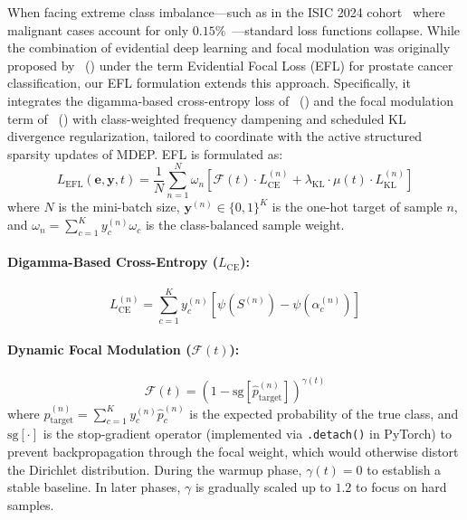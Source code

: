 \documentclass[letterpaper]{article} %
\begin{document}
When facing extreme class imbalance---such as in the ISIC 2024 cohort~\cite{isic2024} where malignant cases account for only $0.15\%$~\cite{johnson2019survey}---standard loss functions collapse. While the combination of evidential deep learning and focal modulation was originally proposed by \citeauthor{zhou2023domain}~(\citeyear{zhou2023domain}) under the term Evidential Focal Loss (EFL) for prostate cancer classification, our EFL formulation extends this approach. Specifically, it integrates the digamma-based cross-entropy loss of \citeauthor{sensoy2018evidential}~(\citeyear{sensoy2018evidential}) and the focal modulation term of \citeauthor{lin2017focal}~(\citeyear{lin2017focal}) with class-weighted frequency dampening and scheduled KL divergence regularization, tailored to coordinate with the active structured sparsity updates of MDEP. EFL is formulated as:
\begin{equation}\label{eq:efl}
    L_{\text{EFL}}(\bm{e}, \bm{y}, t) = \frac{1}{N} \sum_{n=1}^N \omega_n \left[\mathcal{F}(t) \cdot L_{\text{CE}}^{(n)} + \lambda_{\text{KL}} \cdot \mu(t) \cdot L_{\text{KL}}^{(n)}\right]
\end{equation}
where $N$ is the mini-batch size, $\bm{y}^{(n)} \in \{0, 1\}^K$ is the one-hot target of sample $n$, and $\omega_n = \sum_{c=1}^K y_c^{(n)} \omega_c$ is the class-balanced sample weight.

\paragraph{Digamma-Based Cross-Entropy ($L_{\text{CE}}$):}
\begin{equation}
    L_{\text{CE}}^{(n)} = \sum_{c=1}^K y_c^{(n)} \left[\psi(S^{(n)}) - \psi(\alpha_c^{(n)})\right]
\end{equation}

\paragraph{Dynamic Focal Modulation ($\mathcal{F}(t)$):}
\begin{equation}
    \mathcal{F}(t) = \left(1 - \text{sg}[\hat{p}_{\text{target}}^{(n)}]\right)^{\gamma(t)}
\end{equation}
where $\hat{p}_{\text{target}}^{(n)} = \sum_{c=1}^K y_c^{(n)} \hat{p}_c^{(n)}$ is the expected probability of the true class, and $\text{sg}[\cdot]$ is the stop-gradient operator (implemented via \texttt{.detach()} in PyTorch) to prevent backpropagation through the focal weight, which would otherwise distort the Dirichlet distribution. During the warmup phase, $\gamma(t) = 0$ to establish a stable baseline. In later phases, $\gamma$ is gradually scaled up to $1.2$ to focus on hard samples.
\end{document}
